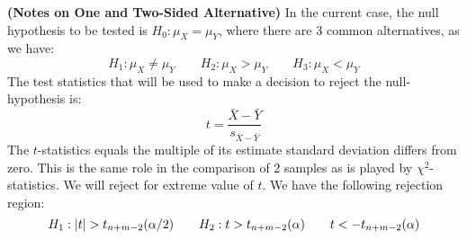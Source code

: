 \begin{remark}{\textbf{(Notes on One and Two-Sided Alternative)}}
    In the current case, the null hypothesis to be tested is $H_0:\mu_X = \mu_Y$, where there are $3$ common alternatives, as we have:
    \begin{equation*}
        H_1 : \mu_X \ne \mu_Y \qquad H_2 : \mu_X > \mu_Y \qquad H_3 : \mu_X < \mu_Y
    \end{equation*}
    The test statistics that will be used to make a decision to reject the null-hypothesis is:
    \begin{equation*}
        t = \frac{\bar{X} - \bar{Y}}{s_{\bar{X} - \bar{Y}}}
    \end{equation*}
    The $t$-statistics equals the multiple of its estimate standard deviation differs from zero. This is the same role in the comparison of $2$ samples as is played by $\chi^2$-statistics. We will reject for extreme value of $t$. We have the following rejection region:
    \begin{equation*}
        H_1 : \left| t \right| > t_{n+m-2}(\alpha/2) \qquad H_2 : t > t_{n+m-2}(\alpha) \qquad t < - t_{n+m-2}(\alpha)
    \end{equation*}
\end{remark}

